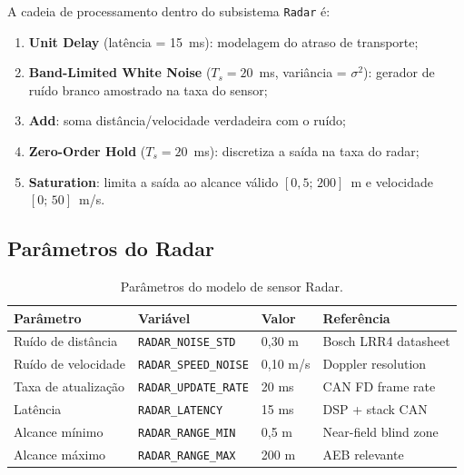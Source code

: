 \documentclass[12pt,a4paper]{article}
\begin{document}
A cadeia de processamento dentro do subsistema \texttt{Radar} \'e:

\begin{enumerate}
  \item \textbf{Unit Delay} (lat\^encia = 15~ms): modelagem do atraso de transporte;
  \item \textbf{Band-Limited White Noise} ($T_s = 20$~ms, vari\^ancia = $\sigma^2$):
    gerador de ru\'ido branco amostrado na taxa do sensor;
  \item \textbf{Add}: soma dist\^ancia/velocidade verdadeira com o ru\'ido;
  \item \textbf{Zero-Order Hold} ($T_s = 20$~ms): discretiza a sa\'ida na taxa do radar;
  \item \textbf{Saturation}: limita a sa\'ida ao alcance v\'alido $[0{,}5;\,200]$~m
    e velocidade $[0;\,50]$~m/s.
\end{enumerate}

\subsection{Par\^ametros do Radar}

\begin{table}[H]
\centering
\caption{Par\^ametros do modelo de sensor Radar.}
\begin{tabularx}{\linewidth}{lXXX}
\toprule
\rowcolor{azulescuro}
\color{white}\textbf{Par\^ametro} &
\color{white}\textbf{Vari\'avel} &
\color{white}\textbf{Valor} &
\color{white}\textbf{Refer\^encia} \\
\midrule
\rowcolor{azulclaro!40}
Ru\'ido de dist\^ancia & \texttt{RADAR\_NOISE\_STD}   & 0,30 m   & Bosch LRR4 datasheet \\
Ru\'ido de velocidade  & \texttt{RADAR\_SPEED\_NOISE} & 0,10 m/s & Doppler resolution \\
\rowcolor{azulclaro!40}
Taxa de atualiza\c{c}\~ao & \texttt{RADAR\_UPDATE\_RATE} & 20 ms & CAN FD frame rate \\
Lat\^encia              & \texttt{RADAR\_LATENCY}      & 15 ms & DSP + stack CAN \\
\rowcolor{azulclaro!40}
Alcance m\'inimo        & \texttt{RADAR\_RANGE\_MIN}   & 0,5 m & Near-field blind zone \\
Alcance m\'aximo        & \texttt{RADAR\_RANGE\_MAX}   & 200 m & AEB relevante \\
\bottomrule
\end{tabularx}
\end{table}
\end{document}
